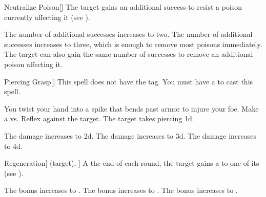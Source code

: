 \lowercase{\hypertarget{spell:Neutralize Poison}{}}\label{spell:Neutralize Poison}
\begin{freeability}[Rank 1]{\hypertarget{spell:Neutralize Poison}{Neutralize Poison}}[]
The target gains an additional success to resist a poison currently affecting it (see ).

\rankline
{} The number of additional successes increases to two.
 The number of additional successes increases to three, which is enough to remove most poisons immediately.
 The target can also gain the same number of successes to remove an additional poison affecting it.
\end{freeability}
\vspace{0.25em}



\lowercase{\hypertarget{spell:Piercing Grasp}{}}\label{spell:Piercing Grasp}
\begin{freeability}[Rank 1]{\hypertarget{spell:Piercing Grasp}{Piercing Grasp}}[]
This spell does not have the  tag.
You must have a  to cast this spell.

You twist your hand into a spike that bends past armor to injure your foe.
Make a  vs. Reflex against the target.
\hit The target takes piercing  \plus1d.

\rankline
{} The damage increases to  \plus2d.
 The damage increases to  \plus3d.
 The damage increases to  \plus4d.
\end{freeability}
\vspace{0.25em}



\lowercase{\hypertarget{spell:Regeneration}{}}\label{spell:Regeneration}
\begin{attuneability}[Rank 1]{\hypertarget{spell:Regeneration}{Regeneration}}[ (target), ]
A the end of each round, the target gains a   to one of its  (see ).

\rankline
{} The bonus increases to .
 The bonus increases to .
 The bonus increases to .
\end{attuneability}
\vspace{0.25em}



